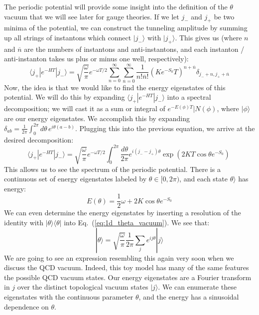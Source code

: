 \documentclass[11pt, oneside]{article}   	%
\theoremstyle{definition}
\begin{document}
The periodic potential will provide some insight into the definition of the $\theta$ vacuum that we will see later for gauge theories. 
If we let $j_-$ and $j_+$ be two minima of the potential, we can construct the tunneling amplitude by summing up all strings of 
instantons which connect $|j_-\rangle$ with $|j_+\rangle$. This gives us (where $n$ and $\overline n$ are the numbers of instantons and 
anti-instantons, and each instanton / anti-instanton takes us plus or minus one well, respectively):
\begin{equation}
	\langle j_+ | e^{-HT} | j_-\rangle = \sqrt{\frac{\omega}{\pi}} e^{-\omega T / 2} \sum_{n = 0}^\infty \sum_{\overline n = 0}^\infty \frac{1}{n!\overline n!} 
	(K e^{-S_0} T)^{n + \overline n}\delta_{j_- + n, j_+ + \overline n}
\end{equation}
Now, the idea is that we would like to find the energy eigenstates of this potential. We will do this by expanding $\langle j_+ | e^{-HT} | j_-\rangle$ into a 
spectral decomposition; we will cast it as a sum or integral of $e^{-E(\phi) T}|N(\phi)$, where $|\phi\rangle$ are our energy eigenstates. 
We accomplish this by expanding $\delta_{ab} = \frac{1}{2\pi}\int_0^{2\pi} d\theta\, e^{i\theta(a - b)}$. Plugging this into the previous equation, we arrive at the 
desired decomposition:
\begin{equation}
	\langle j_+ | e^{-HT} | j_-\rangle = \sqrt{\frac{\omega}{\pi}} e^{-\omega T / 2} \int_0^{2\pi} \frac{d\theta}{2\pi} e^{i(j_- - j_+)\theta}\exp\left(2KT\cos\theta e^{-S_0}\right)~
	\label{eq:1d_theta_vacuum}
\end{equation}
This allows us to see the spectrum of the periodic potential. There is a continuous set of energy eigenstates labeled by $\theta\in [0, 2\pi)$, and each 
state $\theta\rangle$ has energy:
\begin{equation}
	E(\theta) = \frac{1}{2}\omega + 2 K\cos\theta e^{-S_0}
\end{equation}
We can even determine the energy eigenstates by inserting a resolution of the identity with $|\theta\rangle\langle\theta |$ into Eq.~(\ref{eq:1d_theta_vacuum}). 
We see that:
\begin{equation}
	|\theta\rangle = \sqrt{\frac{\omega}{\pi}}\frac{1}{2\pi} \sum_j e^{ij\theta}|j\rangle
\end{equation}
We are going to see an expression resembling this again very soon when we discuss the QCD vacuum. Indeed, this toy model has many of the same 
features the possible QCD vacuum states. Our energy eigenstates are a Fourier transform in $j$ over the distinct topological vacuum states $|j\rangle$. 
We can enumerate these eigenstates with the continuous parameter $\theta$, and the energy has a sinusoidal dependence on $\theta$. 
\end{document}
